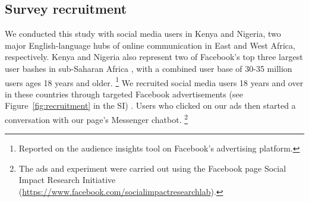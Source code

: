 \documentclass[letterpaper, 12pt, parskip=full,DIV=10]{scrartcl}
\begin{document}
\subsection{Survey recruitment}
We conducted this study with social media users in Kenya and Nigeria, two major English-language hubs of online communication in East and West Africa, respectively. Kenya and Nigeria also represent two of Facebook's top three largest user bashes in sub-Saharan Africa \citep{africa2016top}, with a combined user base of 30-35 million users ages 18 years and older.%
\footnote{
Reported on the audience insights tool on Facebook's advertising platform.%
} We recruited social media users 18 years and over in these countries through targeted Facebook advertisements (see Figure~\ref{fig:recruitment} in the SI) \citep{Rosenzweig_2020}.  Users who clicked on our ads then started a conversation with our page's Messenger chatbot. \footnote{The ads and experiment were carried out using the Facebook page Social Impact Research Initiative (\url{https://www.facebook.com/socialimpactresearchlab}).}
\end{document}
